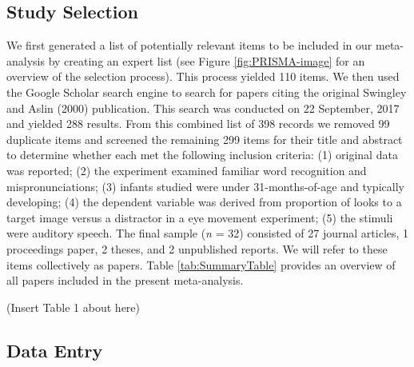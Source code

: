 \documentclass[
  english,
  man, noextraspace]{apa6}
\newenvironment{lltable}{\begin{landscape}\begin{center}\begin{ThreePartTable}}{\end{ThreePartTable}\end{center}\end{landscape}}
\begin{document}
\begin{lltable}
{}

\end{lltable}

\hypertarget{study-selection}{%
\subsection{Study Selection}\label{study-selection}}

We first generated a list of potentially relevant items to be included in our meta-analysis by creating an expert list (see Figure \ref{fig:PRISMA-image} for an overview of the selection process). This process yielded 110 items. We then used the Google Scholar search engine to search for papers citing the original Swingley and Aslin (2000) publication. This search was conducted on 22 September, 2017 and yielded 288 results. From this combined list of 398 records we removed 99 duplicate items and screened the remaining 299 items for their title and abstract to determine whether each met the following inclusion criteria: (1) original data was reported; (2) the experiment examined familiar word recognition and mispronunciations; (3) infants studied were under 31-months-of-age and typically developing; (4) the dependent variable was derived from proportion of looks to a target image versus a distractor in a eye movement experiment; (5) the stimuli were auditory speech. The final sample (\emph{n} = 32) consisted of 27 journal articles, 1 proceedings paper, 2 theses, and 2 unpublished reports. We will refer to these items collectively as papers. Table \ref{tab:SummaryTable} provides an overview of all papers included in the present meta-analysis.

(Insert Table 1 about here)

\hypertarget{data-entry}{%
\subsection{Data Entry}\label{data-entry}}
\end{document}
